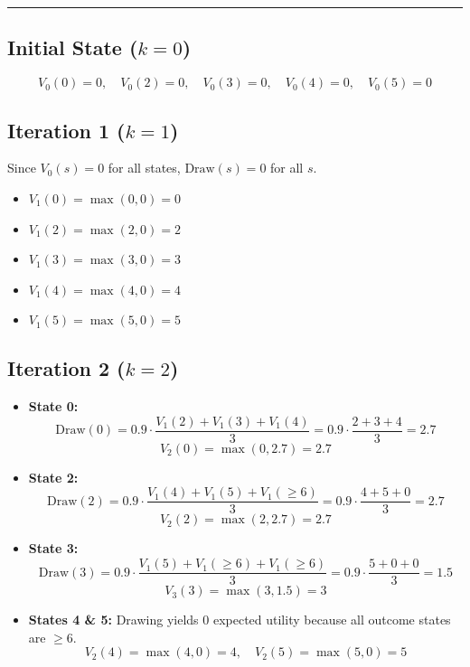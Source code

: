 \documentclass{article}
\begin{document}
\vspace{0.5cm}
\noindent \hrule
\vspace{0.5cm}

\subsection*{Initial State ($k = 0$)}
$$V_0(0) = 0, \quad V_0(2) = 0, \quad V_0(3) = 0, \quad V_0(4) = 0, \quad V_0(5) = 0$$

\subsection*{Iteration 1 ($k = 1$)}
\noindent Since $V_0(s) = 0$ for all states, $\text{Draw}(s) = 0$ for all $s$.
\begin{itemize}
    \item $V_1(0) = \max(0, 0) = 0$
    \item $V_1(2) = \max(2, 0) = 2$
    \item $V_1(3) = \max(3, 0) = 3$
    \item $V_1(4) = \max(4, 0) = 4$
    \item $V_1(5) = \max(5, 0) = 5$
\end{itemize}

\subsection*{Iteration 2 ($k = 2$)}
\begin{itemize}
    \item \textbf{State 0:} 
    $$\text{Draw}(0) = 0.9 \cdot \frac{V_1(2) + V_1(3) + V_1(4)}{3} = 0.9 \cdot \frac{2 + 3 + 4}{3} = 2.7$$
    $$V_2(0) = \max(0, 2.7) = 2.7$$
    
    \item \textbf{State 2:} 
    $$\text{Draw}(2) = 0.9 \cdot \frac{V_1(4) + V_1(5) + V_1(\ge 6)}{3} = 0.9 \cdot \frac{4 + 5 + 0}{3} = 2.7$$
    $$V_2(2) = \max(2, 2.7) = 2.7$$
    
    \item \textbf{State 3:} 
    $$\text{Draw}(3) = 0.9 \cdot \frac{V_1(5) + V_1(\ge 6) + V_1(\ge 6)}{3} = 0.9 \cdot \frac{5 + 0 + 0}{3} = 1.5$$
    $$V_3(3) = \max(3, 1.5) = 3$$
    
    \item \textbf{States 4 \& 5:} Drawing yields $0$ expected utility because all outcome states are $\ge 6$.
    $$V_2(4) = \max(4, 0) = 4, \quad V_2(5) = \max(5, 0) = 5$$
\end{itemize}
\end{document}
